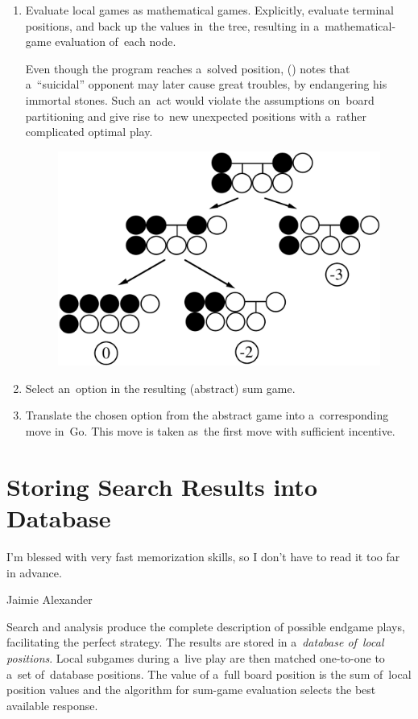 \begin{enumerate}
  \item Evaluate local games as mathematical games.
    Explicitly, evaluate terminal positions, and back up the values in~the tree, resulting in a~mathematical-game evaluation of~each node.

    Even though the program reaches a~solved position, (\cite{Muller1995computer}) notes that a~``suicidal'' opponent may later cause great troubles, by endangering his immortal stones.
    Such an~act would violate the assumptions on~board partitioning and give rise to~new unexpected positions with a~rather complicated optimal play.

\begin{figure}[H]
  \centering
  \includegraphics[width=.7\textwidth]{../img/Go_search_tree.png}
\end{figure}

  \item Select an~option in the resulting (abstract) sum game.

  \item Translate the chosen option from the abstract game into a~corresponding move in~Go.
    This move is taken as~the first move with sufficient incentive.
\end{enumerate}

\section{Storing Search Results into Database}
\epigraph{
  I'm blessed with very fast memorization skills, so I don't have to read it too far in advance.
}{Jaimie Alexander}
Search and analysis produce the complete description of possible endgame plays, facilitating the perfect strategy.
The results are stored in a~\emph{database of~local positions}.
Local subgames during a~live play are then matched one-to-one to a~set of~database positions.
The value of a~full board position is the sum of~local position values and the algorithm for sum-game evaluation selects the best available response.

